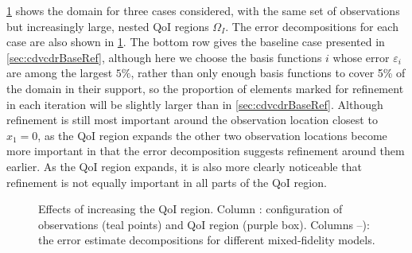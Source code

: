 \cref{fig:qoiStudy} shows the domain for three cases considered, with the same set of observations but increasingly large, nested QoI regions $\Omega_I$.
The error decompositions for each case are also shown in \cref{fig:qoiStudy}. The bottom row gives the baseline case presented in \cref{sec:cdvcdrBaseRef}, although here we choose the basis functions $i$ whose error $\varepsilon_i$ are among the largest $5\%$, rather than only enough basis functions to cover 5\% of the domain in their support, so the proportion of elements marked for refinement in each iteration will be slightly larger than in \cref{sec:cdvcdrBaseRef}.
Although refinement is still most important around the observation location closest to $x_1=0$, as the QoI region expands the other two observation locations become more important in that the error decomposition suggests refinement around them earlier. As the QoI region expands, it is also more clearly noticeable that refinement is not equally important in all parts of the QoI region.

\begin{figure}[htbp]
\centering
{}
  \caption{Effects of increasing the QoI region. Column \protect{}: configuration of observations (teal points) and QoI region (purple box). Columns \protect{}--\protect{}): the error estimate decompositions for different mixed-fidelity models.}
  \label{fig:qoiStudy}
\end{figure}

